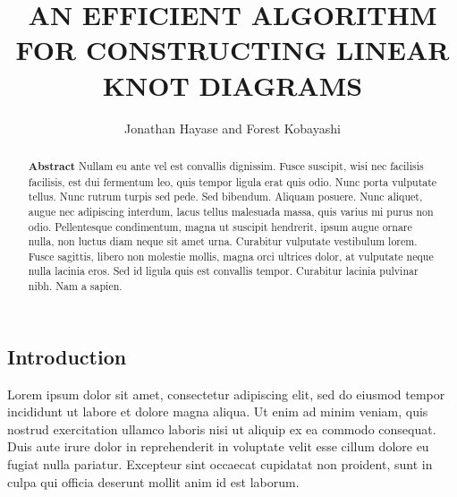 \documentclass{fkpaper}
\title{AN EFFICIENT ALGORITHM FOR CONSTRUCTING LINEAR KNOT DIAGRAMS}
\author{Jonathan Hayase and Forest Kobayashi}
\affiliation{Department of Mathematics, Harvey Mudd College,
  Claremont, CA, 91711}
\begin{document}



\begin{abstract}
  \textbf{Abstract} Nullam eu ante vel est convallis dignissim. Fusce
  suscipit, wisi nec facilisis facilisis, est dui fermentum leo, quis
  tempor ligula erat quis odio. Nunc porta vulputate tellus. Nunc
  rutrum turpis sed pede. Sed bibendum. Aliquam posuere. Nunc aliquet,
  augue nec adipiscing interdum, lacus tellus malesuada massa, quis
  varius mi purus non odio. Pellentesque condimentum, magna ut
  suscipit hendrerit, ipsum augue ornare nulla, non luctus diam neque
  sit amet urna. Curabitur vulputate vestibulum lorem. Fusce sagittis,
  libero non molestie mollis, magna orci ultrices dolor, at vulputate
  neque nulla lacinia eros. Sed id ligula quis est convallis tempor.
  Curabitur lacinia pulvinar nibh. Nam a sapien.
\end{abstract}


\begin{multicols}{2}
  \section{Introduction}
  Lorem ipsum dolor sit amet, consectetur adipiscing elit, sed do
  eiusmod tempor incididunt ut labore et dolore magna aliqua. Ut enim
  ad minim veniam, quis nostrud exercitation ullamco laboris nisi ut
  aliquip ex ea commodo consequat. Duis aute irure dolor in
  reprehenderit in voluptate velit esse cillum dolore eu fugiat nulla
  pariatur. Excepteur sint occaecat cupidatat non proident, sunt in
  culpa qui officia deserunt mollit anim id est laborum.




\end{multicols}




\nocite{*}
\end{document}
